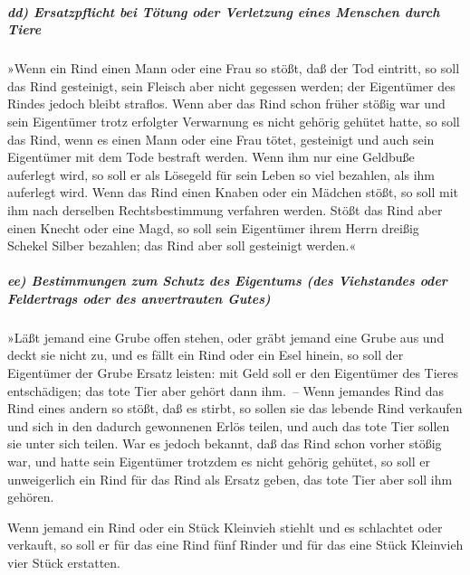 \hypertarget{dd-ersatzpflicht-bei-tuxf6tung-oder-verletzung-eines-menschen-durch-tiere}{%
\subparagraph{dd) Ersatzpflicht bei Tötung oder Verletzung eines
Menschen durch
Tiere}\label{dd-ersatzpflicht-bei-tuxf6tung-oder-verletzung-eines-menschen-durch-tiere}}

 »Wenn ein Rind einen Mann oder eine Frau so stößt, daß
der Tod eintritt, so soll das Rind gesteinigt, sein Fleisch aber nicht
gegessen werden; der Eigentümer des Rindes jedoch bleibt straflos.
 Wenn aber das Rind schon früher stößig war und sein
Eigentümer trotz erfolgter Verwarnung es nicht gehörig gehütet hatte, so
soll das Rind, wenn es einen Mann oder eine Frau tötet, gesteinigt und
auch sein Eigentümer mit dem Tode bestraft werden.  Wenn
ihm nur eine Geldbuße auferlegt wird, so soll er als Lösegeld für sein
Leben so viel bezahlen, als ihm auferlegt wird.  Wenn das
Rind einen Knaben oder ein Mädchen stößt, so soll mit ihm nach derselben
Rechtsbestimmung verfahren werden.  Stößt das Rind aber
einen Knecht oder eine Magd, so soll sein Eigentümer ihrem Herrn dreißig
Schekel Silber bezahlen; das Rind aber soll gesteinigt werden.«

\hypertarget{ee-bestimmungen-zum-schutz-des-eigentums-des-viehstandes-oder-feldertrags-oder-des-anvertrauten-gutes}{%
\subparagraph{ee) Bestimmungen zum Schutz des Eigentums (des Viehstandes
oder Feldertrags oder des anvertrauten
Gutes)}\label{ee-bestimmungen-zum-schutz-des-eigentums-des-viehstandes-oder-feldertrags-oder-des-anvertrauten-gutes}}

 »Läßt jemand eine Grube offen stehen, oder gräbt jemand
eine Grube aus und deckt sie nicht zu, und es fällt ein Rind oder ein
Esel hinein,  so soll der Eigentümer der Grube Ersatz
leisten: mit Geld soll er den Eigentümer des Tieres entschädigen; das
tote Tier aber gehört dann ihm.~--  Wenn jemandes Rind
das Rind eines andern so stößt, daß es stirbt, so sollen sie das lebende
Rind verkaufen und sich in den dadurch gewonnenen Erlös teilen, und auch
das tote Tier sollen sie unter sich teilen.  War es
jedoch bekannt, daß das Rind schon vorher stößig war, und hatte sein
Eigentümer trotzdem es nicht gehörig gehütet, so soll er unweigerlich
ein Rind für das Rind als Ersatz geben, das tote Tier aber soll ihm
gehören.

 Wenn jemand ein Rind oder ein Stück Kleinvieh stiehlt
und es schlachtet oder verkauft, so soll er für das eine Rind fünf
Rinder und für das eine Stück Kleinvieh vier Stück erstatten.


